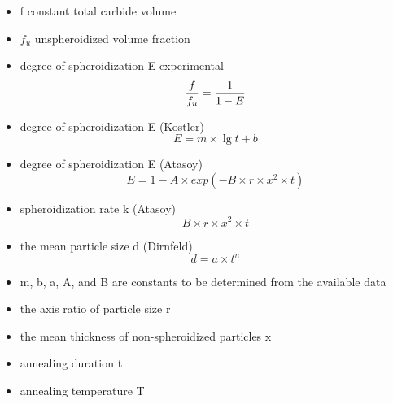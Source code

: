 \documentclass[a4paper, 14pt]{article}
\begin{document}
	\begin{itemize}
		\item f constant total carbide volume
		
		\item $f_u$ unspheroidized volume fraction
		
		\item degree of spheroidization E experimental\\
		\begin{equation}
				{f \over  f_u } = {1 \over 1-E }
				\label{eq:E_exp}
		\end{equation}
		
		\item degree of spheroidization E (Kostler)\\
		\begin{equation}
			E=m \times \lg t + b
			\label{eq:kostler}
		\end{equation}
	
		\item degree of spheroidization E (Atasoy)\\
		\begin{equation}
			E=1-A\times exp(-B\times r \times x^2 \times t)
			\label{eq:atasoy}
		\end{equation}
	
		\item spheroidization rate k (Atasoy)\\
		\begin{equation}
		B\times r \times x^2 \times t
			\label{eq:atasoyr}
		\end{equation}
		
		\item the mean particle size d (Dirnfeld)\\
		\begin{equation}
			d=a \times t^n
			\label{eq:dirnfeld}
		\end{equation}

		\item m, b, a, A, and B are constants to be determined from the
		available data
		
		\item the axis ratio of particle size r
		
		\item the mean thickness of non-spheroidized particles x
		
		\item annealing duration t 
		
		\item annealing temperature T
		

\end{itemize}
\end{document}
